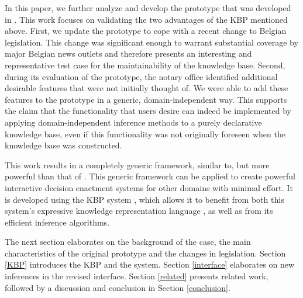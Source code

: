 In this paper, we further analyze and develop the prototype that was developed in \cite{ruleml/DeryckHVV18}. This work focuses on validating the two advantages of the KBP mentioned above.
First, we update the prototype to cope with a recent change to Belgian legislation. This change was significant enough to warrant substantial coverage by major Belgian news outlets and therefore presents an interesting and representative test case for the maintainability of the knowledge base.
Second, during its evaluation of the prototype, the notary office identified additional desirable features that were not initially thought of. 
We were able to add these features to the prototype in a generic, domain-independent way. This supports the claim that the functionality that users desire can indeed be implemented by applying domain-independent inference methods to a purely declarative knowledge base, even if this functionality was not originally foreseen when the knowledge base was constructed.

This work results in a completely generic framework, similar to, but more powerful than that of \cite{ruleml/DassevilleJJVD16}. This generic framework can be applied to create powerful interactive decision enactment systems for other domains with minimal effort. It is developed using the \idp KBP system , which allows it to benefit from both this system's expressive knowledge representation language \fodot, as well as from its efficient inference algorithms.
 
The next section elaborates on the background of the case, the main characteristics of the original prototype and the changes in legislation.
Section \ref{KBP} introduces the KBP and the \idp system.
Section \ref{interface} elaborates on new inferences in the revised interface.  
Section \ref{related} presents related work, followed by a discussion and conclusion in Section \ref{conclusion}.